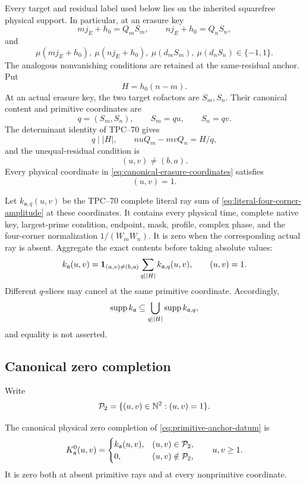 Every target and residual label used below lies on the inherited
squarefree physical support.  In particular, at an erasure key
\[
 mj_E+h_0=Q_mS_m,\qquad nj_E+h_0=Q_nS_n,
\]
and
\[
 \mu(mj_E+h_0),\ \mu(nj_E+h_0),\
 \mu(d_mS_m),\ \mu(d_nS_n)\in\{-1,1\}.
\]
The analogous nonvanishing conditions are retained at the
same-residual anchor.
Put
\[
 H=h_0(n-m).
\]
At an actual erasure key, the two target cofactors are \(S_m,S_n\).
Their canonical content and primitive coordinates are
\begin{equation}
 q=(S_m,S_n),\qquad S_m=qu,\qquad S_n=qv.
 \label{eq:canonical-erasure-coordinates}
\end{equation}
The determinant identity of TPC--70 \citep{WangTPC70} gives
\[
 q\mid |H|,
 \qquad
 nuQ_m-mvQ_n=H/q,
\]
and the unequal-residual condition is
\begin{equation}
 (u,v)\ne(b,a).
 \label{eq:excluded-anchor-direction}
\end{equation}
Every physical coordinate in \eqref{eq:canonical-erasure-coordinates}
satisfies
\begin{equation}
 (u,v)=1.
 \label{eq:physical-primitivity}
\end{equation}

Let \(k_{\mathfrak a,q}(u,v)\) be the TPC--70 complete literal ray sum of
\eqref{eq:literal-four-corner-amplitude} at these coordinates.  It contains
every physical time, complete native key, largest-prime condition,
endpoint, mask, profile, complex phase, and the four-corner normalization
\(1/(W_mW_n)\).  It is zero when the corresponding actual ray is absent.
Aggregate the exact contents before taking absolute values:
\begin{equation}
 k_{\mathfrak a}(u,v)
 =
 \mathbf 1_{(u,v)\ne(b,a)}
 \sum_{q\mid|H|}k_{\mathfrak a,q}(u,v),
 \qquad (u,v)=1.
 \label{eq:primitive-anchor-datum}
\end{equation}
Different \(q\)-slices may cancel at the same primitive coordinate.
Accordingly,
\[
 \operatorname{supp} k_{\mathfrak a}
 \subseteq
 \bigcup_{q\mid|H|}\operatorname{supp} k_{\mathfrak a,q},
\]
and equality is not asserted.

\subsection{Canonical zero completion}

Write
\[
 \mathcal P_2=\{(u,v)\in\mathbb N^2:(u,v)=1\}.
\]

\begin{definition}
\label{def:canonical-zero-completion}
The canonical physical zero completion of
\eqref{eq:primitive-anchor-datum} is
\begin{equation}
 K_{\mathfrak a}^{0}(u,v)
 =
 \begin{cases}
  k_{\mathfrak a}(u,v),&(u,v)\in\mathcal P_2,\\
  0,&(u,v)\notin\mathcal P_2,
 \end{cases}
 \qquad u,v\ge1.
 \label{eq:canonical-zero-completion}
\end{equation}
It is zero both at absent primitive rays and at every nonprimitive
coordinate.
\end{definition}

